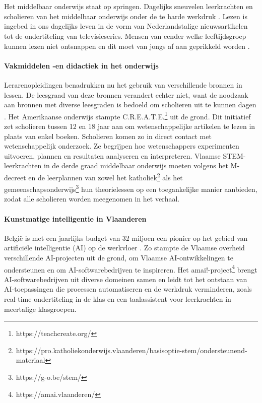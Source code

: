 
\chapter{}%
\label{ch:inleiding}

Het middelbaar onderwijs staat op springen. Dagelijks sneuvelen leerkrachten en scholieren van het middelbaar onderwijs onder de te harde werkdruk \autocite{Glorieux2018}. Lezen is ingebed in ons dagelijks leven in de vorm van Nederlandstalige nieuwsartikelen tot de ondertiteling van televisieseries. Mensen van eender welke leeftijdsgroep kunnen lezen niet ontsnappen en dit moet van jongs af aan geprikkeld worden \autocite{Daoud2023}.

\subsubsection{Vakmiddelen -en didactiek in het onderwijs}
Lerarenopleidingen benadrukken nu het gebruik van verschillende bronnen in lessen. De leesgraad van deze bronnen verandert echter niet, want de noodzaak aan bronnen met diverse leesgraden is bedoeld om scholieren uit te kunnen dagen \autocite{Surma2019}. Het Amerikaanse onderwijs stampte C.R.E.A.T.E.\footnote{https://teachcreate.org/} uit de grond. Dit initiatief zet scholieren tussen 12 en 18 jaar aan om wetenschappelijke artikelen te lezen in plaats van enkel boeken. Scholieren komen zo in direct contact met wetenschappelijk onderzoek. Ze begrijpen hoe wetenschappers experimenten uitvoeren, plannen en resultaten analyseren en interpreteren. Vlaamse STEM-leerkrachten in de derde graad middelbaar onderwijs moeten volgens het M-decreet en de leerplannen van zowel het katholiek\footnote{https://pro.katholiekonderwijs.vlaanderen/basisoptie-stem/ondersteunend-materiaal} als het gemeenschapsonderwijs\footnote{https://g-o.be/stem/} hun theorielessen op een toegankelijke manier aanbieden, zodat alle scholieren worden meegenomen in het verhaal. 

\subsubsection{Kunstmatige intelligentie in Vlaanderen}
België is met een jaarlijks budget van 32 miljoen een pionier op het gebied van artificiële intelligentie (AI) op de werkvloer \autocite{Crevits2022}. Zo stampte de Vlaamse overheid verschillende AI-projecten uit de grond, om Vlaamse AI-ontwikkelingen te ondersteunen en om AI-softwarebedrijven te inspireren. Het amai!-project\footnote{https://amai.vlaanderen/} brengt AI-softwarebedrijven uit diverse domeinen samen en leidt tot het ontstaan van AI-toepassingen die processen automatiseren en de werkdruk verminderen, zoals real-time ondertiteling in de klas en een taalassistent voor leerkrachten in meertalige klasgroepen.

